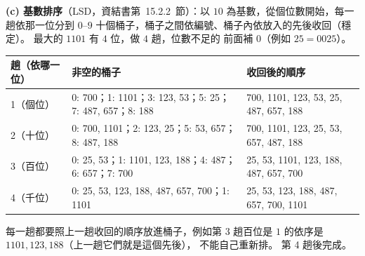 \begin{pastsoln}
\textbf{(c) 基數排序}（LSD，資結書第~15.2.2~節）：以 $10$ 為基數，從個位數開始，每一趟依那一位分到 $0$--$9$
十個桶子，桶子之間依編號、桶子內依放入的先後收回（穩定）。 最大的 $1101$ 有 $4$ 位，做 $4$ 趟，位數不足的
前面補 $0$（例如 $25 = 0025$）。
\begin{center}
\small
\begin{tabular}{p{1.5cm}p{6.4cm}p{5.6cm}}
\toprule
趟（依哪一位） & 非空的桶子 & 收回後的順序 \\
\midrule
1（個位） & 0: 700；1: 1101；3: 123, 53；5: 25；7: 487, 657；8: 188 & 700, 1101, 123, 53, 25, 487, 657, 188 \\
2（十位） & 0: 700, 1101；2: 123, 25；5: 53, 657；8: 487, 188 & 700, 1101, 123, 25, 53, 657, 487, 188 \\
3（百位） & 0: 25, 53；1: 1101, 123, 188；4: 487；6: 657；7: 700 & 25, 53, 1101, 123, 188, 487, 657, 700 \\
4（千位） & 0: 25, 53, 123, 188, 487, 657, 700；1: 1101 & 25, 53, 123, 188, 487, 657, 700, 1101 \\
\bottomrule
\end{tabular}
\end{center}
每一趟都要照上一趟收回的順序放進桶子，例如第 3 趟百位是 $1$ 的依序是 $1101, 123, 188$（上一趟它們就是這個先後），
不能自己重新排。 第 4 趟後完成。
\end{pastsoln}
